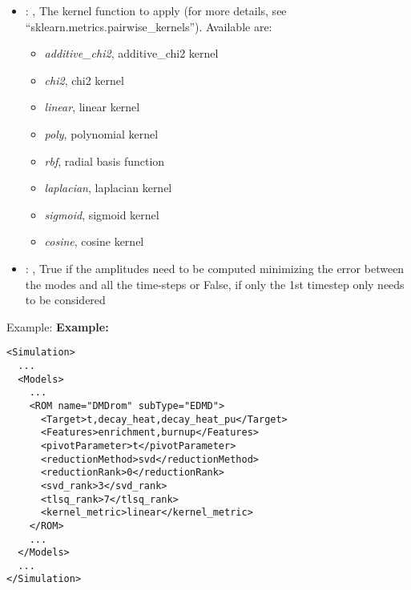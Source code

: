 \begin{itemize}
    \item {}: ,
      The kernel function to apply (for more details, see ``sklearn.metrics.pairwise\_kernels'').
      Available are:                                                   \begin{itemize}
      \item \textit{additive\_chi2}, additive\_chi2 kernel
      \item \textit{chi2}, chi2 kernel                                                     \item
      \textit{linear}, linear kernel                                                     \item
      \textit{poly}, polynomial kernel                                                     \item
      \textit{rbf}, radial basis function                                                     \item
      \textit{laplacian}, laplacian kernel                                                     \item
      \textit{sigmoid}, sigmoid kernel                                                     \item
      \textit{cosine}, cosine kernel                                                   \end{itemize}

    \item {}: ,
      True if the amplitudes need to be computed minimizing the error
      between the modes and all the time-steps or False, if only the 1st timestep only needs to be
      considered
  \end{itemize}

\hspace{24pt}
Example:
\textbf{Example:}
\begin{lstlisting}[style=XML,morekeywords={name,subType}]
<Simulation>
  ...
  <Models>
    ...
    <ROM name="DMDrom" subType="EDMD">
      <Target>t,decay_heat,decay_heat_pu</Target>
      <Features>enrichment,burnup</Features>
      <pivotParameter>t</pivotParameter>
      <reductionMethod>svd</reductionMethod>
      <reductionRank>0</reductionRank>
      <svd_rank>3</svd_rank>
      <tlsq_rank>7</tlsq_rank>
      <kernel_metric>linear</kernel_metric>
    </ROM>
    ...
  </Models>
  ...
</Simulation>
\end{lstlisting}


